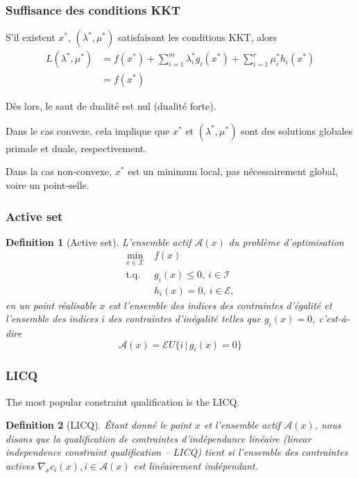 \documentclass[usepdftitle=false]{beamer}
\newtheorem{defn}{Definition}
\def\red{\color{red}}
\def\cA{\mathcal{A}}
\def\cE{\mathcal{E}}
\def\cI{\mathcal{I}}
\def\cL{\mathcal{L}}
\def\cX{\mathcal{X}}
\begin{document}
\begin{frame}
	\frametitle{Suffisance des conditions KKT}
	
	S'il existent $x^*$, $(\lambda^*, \mu^*)$ satisfaisant les conditions KKT, alors
	\begin{align*}
	L(\lambda^*, \mu^*) &= f(x^*) + \sum_{i = 1}^m \lambda_i^* g_i(x^*) + \sum_{i = 1}^r \mu_i^* h_i(x^*) \\
	&= f(x^*)
	\end{align*}
	
	Dès lors, le saut de dualité est nul ({\red dualité forte}).
	
	\mbox{}
	
	Dans le cas convexe, cela implique que 	$x^*$ et $(\lambda^*, \mu^*)$ sont des solutions globales primale et duale, respectivement.

	\mbox{}

	Dans la cas non-convexe, $x^*$ est un minimum local, pas nécessairement global, voire un point-selle.
	
	
\end{frame}

\begin{frame}
\frametitle{Active set}

\begin{defn}[Active set]
L'ensemble actif $\cA(x)$ du problème d'optimisation
\begin{align*}
\min_{x \in \cX} \ & f(x) \\
\mbox{t.q. } & g_i(x) \leq 0,\ i \in \cI \\
& h_i(x) = 0,\ i \in \cE,
\end{align*}
en un point réalisable $x$ est l'ensemble des indices des contraintes d'égalité et l'ensemble des indices $i$ des contraintes d'inégalité telles que $g_i(x) = 0$, c'est-à-dire
$$
\cA(x) = \cE U \{ i \,|\, g_i(x) = 0 \}
$$
\end{defn}

\end{frame}

\begin{frame}
\frametitle{LICQ}

The most popular constraint qualification is the LICQ.

\begin{defn}[LICQ]
Étant donné le point $x$ et l'ensemble actif $\cA(x)$, nous disons que la qualification de contraintes d'indépendance linéaire (linear
independence constraint qualification -- LICQ) tient si l'ensemble des contraintes actives $\nabla_x c_i(x), i \in \cA(x)$ est linéairement indépendant.
\end{defn}

\end{frame}
\end{document}
